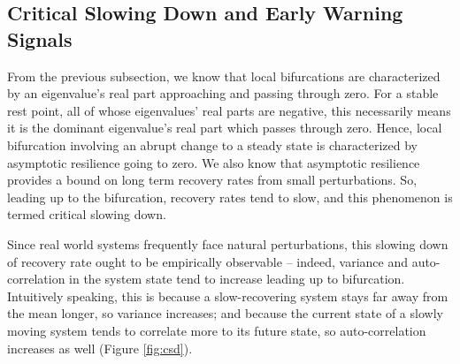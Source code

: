 %	
%	
%	
%
%	


%


\subsection{Critical Slowing Down and Early Warning Signals}

From the previous subsection, we know that local bifurcations are characterized by an eigenvalue's real part approaching and passing through zero. For a stable rest point, all of whose eigenvalues' real parts are negative, this necessarily means it is the dominant eigenvalue's real part which passes through zero. Hence, local bifurcation involving an abrupt change to a steady state is characterized by asymptotic resilience going to zero. We also know that asymptotic resilience provides a bound on long term recovery rates from small perturbations. So, leading up to the bifurcation, recovery rates tend to slow, and this phenomenon is termed critical slowing down. 

Since real world systems frequently face natural perturbations, this slowing down of recovery rate ought to be empirically observable -- indeed, variance and auto-correlation in the system state tend to increase leading up to bifurcation. Intuitively speaking, this is because a slow-recovering system stays far away from the mean longer, so variance increases; and because the current state of a slowly moving system tends to correlate more to its future state, so auto-correlation increases as well (Figure \ref{fig:csd}).

